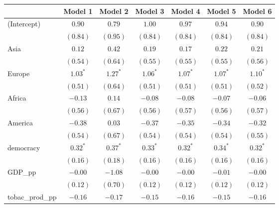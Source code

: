 
\begin{table}[!h]
\begin{center}
\begin{tabular}{l c c c c c c }
\toprule
 & Model 1 & Model 2 & Model 3 & Model 4 & Model 5 & Model 6 \\
\midrule
(Intercept)             & $0.90$       & $0.79$       & $1.00$       & $0.97$       & $0.94$       & $0.90$       \\
                        & $(0.84)$     & $(0.95)$     & $(0.84)$     & $(0.84)$     & $(0.84)$     & $(0.84)$     \\
Asia                    & $0.12$       & $0.42$       & $0.19$       & $0.17$       & $0.22$       & $0.21$       \\
                        & $(0.54)$     & $(0.64)$     & $(0.55)$     & $(0.55)$     & $(0.55)$     & $(0.56)$     \\
Europe                  & $1.03^{*}$   & $1.27^{*}$   & $1.06^{*}$   & $1.07^{*}$   & $1.07^{*}$   & $1.10^{*}$   \\
                        & $(0.51)$     & $(0.64)$     & $(0.51)$     & $(0.51)$     & $(0.51)$     & $(0.52)$     \\
Africa                  & $-0.13$      & $0.14$       & $-0.08$      & $-0.08$      & $-0.07$      & $-0.06$      \\
                        & $(0.56)$     & $(0.67)$     & $(0.56)$     & $(0.57)$     & $(0.56)$     & $(0.57)$     \\
America                 & $-0.38$      & $0.03$       & $-0.37$      & $-0.35$      & $-0.34$      & $-0.32$      \\
                        & $(0.54)$     & $(0.67)$     & $(0.54)$     & $(0.54)$     & $(0.54)$     & $(0.55)$     \\
democracy               & $0.32^{*}$   & $0.37^{*}$   & $0.33^{*}$   & $0.32^{*}$   & $0.34^{*}$   & $0.32^{*}$   \\
                        & $(0.16)$     & $(0.18)$     & $(0.16)$     & $(0.16)$     & $(0.16)$     & $(0.16)$     \\
GDP\_pp                 & $-0.00$      & $-1.08$      & $-0.00$      & $-0.00$      & $-0.01$      & $-0.00$      \\
                        & $(0.12)$     & $(0.70)$     & $(0.12)$     & $(0.12)$     & $(0.12)$     & $(0.12)$     \\
tobac\_prod\_pp         & $-0.16$      & $-0.17$      & $-0.15$      & $-0.16$      & $-0.15$      & $-0.16$      \\

\end{tabular}
\end{center}
\end{table}
